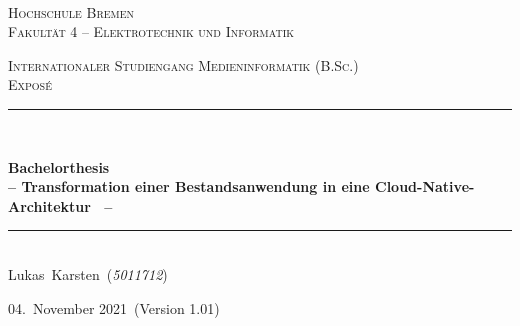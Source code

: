 \documentclass[11pt]{scrartcl}
\newcommand{\MetaInstitute}{Hochschule Bremen}
\newcommand{\MetaUnit}{Fakultät 4 -- Elektrotechnik und Informatik}
\newcommand{\MetaTitle}{Bachelorthesis}
\newcommand{\MetaSubtitle}{Transformation einer Bestandsanwendung in eine Cloud-Native-Architektur
}
\newcommand{\MetaTask}{Exposé}
\newcommand{\MetaAuthorName}{Lukas}
\newcommand{\MetaAuthorSurname}{Karsten}
\newcommand{\MetaAuthor}{\MetaAuthorName~\MetaAuthorSurname}
\newcommand{\MetaStudentNumber}{\textit{5011712}}
\newcommand{\MetaStudyProgram}{Internationaler Studiengang Medieninformatik (B.Sc.)}
\newcommand{\MetaDate}{04.\ November 2021}
\newcommand{\MetaVersion}{1.01}
\newcommand{\HRule}{\rule{\linewidth}{0.2mm}}	%
\begin{document}
\begin{titlepage}
  	\shortdate %
  	\center %

  	~\\[1cm]


	\begin{figure}[h!]
    		\centering
	\end{figure}

	\vspace{-0.5cm}
	\textsc{\Large \MetaInstitute}\\[0.2cm] %
	\textsc{\Large \MetaUnit}%
	
	\textsc{\large \MetaStudyProgram}\\[1.5cm]
	
	\textsc{\LARGE \MetaTask}\\[1.5cm] %

	\HRule \\[0.5cm]
	{
		\LARGE \bfseries \MetaTitle \\[0.50cm] %
		\Large \bfseries -- \MetaSubtitle\ -- \\[0.50cm] %
		\par
	}
	\HRule \\[1.5cm]

	\large 
	\MetaAuthor\ (\MetaStudentNumber)\

	\vspace*{\fill}
	{
     \large \MetaDate\ (Version \MetaVersion)
	}
\end{titlepage}
\end{document}
